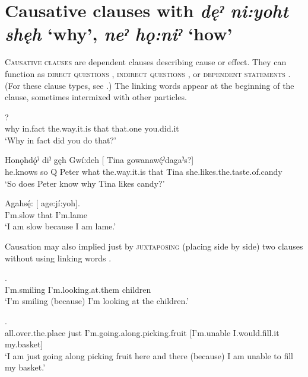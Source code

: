 \largerpage
\section{Causative clauses with \textit{dęˀ ni:yoht shęh} ‘why’, \textit{neˀ hǫ:niˀ} ‘how’} \label{ch:Causative clauses with [dęˀ ni:yoht shęh] ‘why’, [neˀ hǫ:niˀ] ‘how’}
\textsc{Causative clauses} are dependent clauses describing cause or effect. They can function as \textsc{direct questions} , \textsc{indirect questions} , or \textsc{dependent statements} . (For these clause types, see .) The linking words appear at the beginning of the clause, sometimes intermixed with other particles. 

\ea\label{ex:caussent1}
?\\
why in.fact the.way.it.is that that.one you.did.it\\
\glt ‘Why in fact did you do that?’ 
\z

\ea\label{ex:caussent2} 
\gll Honǫhdǫ́ˀ diˀ gęh Gwí:deh  [     Tina gowanawę́ˀdagaˀs?]\\
he.knows so Q Peter what the.way.it.is that Tina she.likes.the.taste.of.candy\\
\glt ‘So does Peter know why Tina likes candy?’
\z

\ea\label{ex:caussent3} 
\gll Agahsę́: [ age:jí:yoh]. \\
I’m.slow that I’m.lame\\
\glt ‘I am slow because I am lame.’ 
\z

Causation may also implied just by \textsc{juxtaposing} (placing side by side) two clauses without using linking words .

\ea\label{ex:trehssuborex9} 
.\\
I’m.smiling I’m.looking.at.them children\\
\glt ‘I’m smiling (because) I’m looking at the children.’ 
\z

\ea\label{ex:trehssuborex10} 
. \\
all.over.the.place just I’m.going.along.picking.fruit [I’m.unable I.would.fill.it my.basket]\\
\glt ‘I am just going along picking fruit here and there (because) I am unable to fill my basket.’
\z


